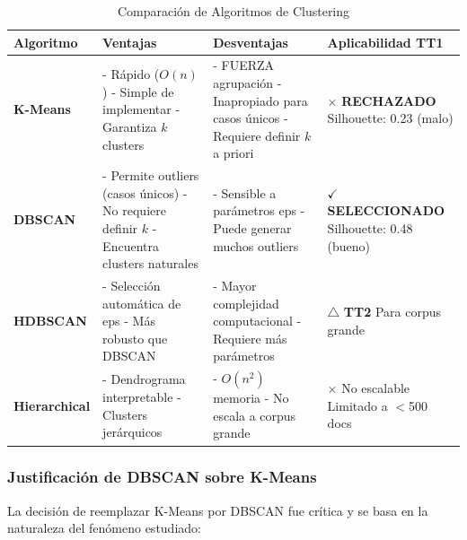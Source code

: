 \begin{table}[h]
\centering
\caption{Comparación de Algoritmos de Clustering}
\label{tab:clustering_comparacion}
\begin{tabular}{|p{2.5cm}|p{4.5cm}|p{4cm}|p{3cm}|}
\hline
\textbf{Algoritmo} & \textbf{Ventajas} & \textbf{Desventajas} & \textbf{Aplicabilidad TT1} \\
\hline
\textbf{K-Means} & 
- Rápido ($O(n)$) \newline
- Simple de implementar \newline
- Garantiza $k$ clusters & 
- FUERZA agrupación \newline
- Inapropiado para casos únicos \newline
- Requiere definir $k$ a priori & 
$\times$ \textbf{RECHAZADO} \newline
Silhouette: 0.23 (malo) \\
\hline
\textbf{DBSCAN} & 
- Permite outliers (casos únicos) \newline
- No requiere definir $k$ \newline
- Encuentra clusters naturales & 
- Sensible a parámetros eps \newline
- Puede generar muchos outliers & 
\textbf{$\checkmark$ SELECCIONADO} \newline
Silhouette: 0.48 (bueno) \\
\hline
\textbf{HDBSCAN} & 
- Selección automática de eps \newline
- Más robusto que DBSCAN & 
- Mayor complejidad computacional \newline
- Requiere más parámetros & 
$\triangle$ \textbf{TT2} \newline
Para corpus grande \\
\hline
\textbf{Hierarchical} & 
- Dendrograma interpretable \newline
- Clusters jerárquicos & 
- $O(n^2)$ memoria \newline
- No escala a corpus grande & 
$\times$ No escalable \newline
Limitado a $<$500 docs \\
\hline
\end{tabular}
\end{table}

\subsubsection{Justificación de DBSCAN sobre K-Means}
\label{subsubsec:justificacion_dbscan}

La decisión de reemplazar K-Means por DBSCAN fue crítica y se basa en la naturaleza del fenómeno estudiado:

